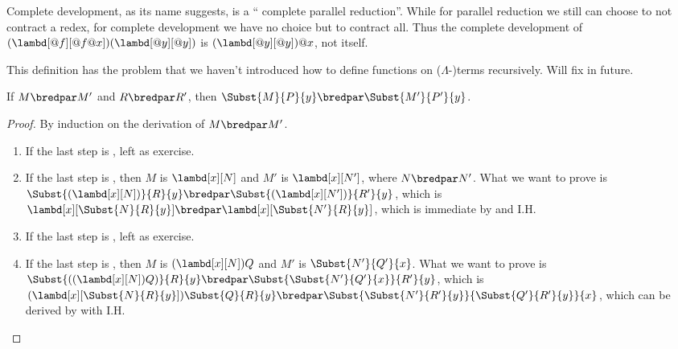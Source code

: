 \documentclass[../../../include/open-logic-section]{subfiles}
\begin{document}
Complete development, as its name suggests, is a ``
complete parallel reduction''. While for parallel reduction we still can choose
to not contract a redex, for complete development we have no choice
but to contract all. Thus the complete
development of $(\lambd[@f][@f@x])(\lambd[@y][@y])$ is
$(\lambd[@y][@y])@x$, not itself.

\begin{editorial}
  This definition has the problem that we haven't introduced how to
  define functions on ($\Lambda$-)terms recursively. Will fix in future.
\end{editorial}

\begin{lem}
  If $M \bredpar M'$ and $R \bredpar R'$, then $\Subst{M}{P}{y}
  \bredpar \Subst{M'}{P'}{y}$.
\end{lem}
\begin{proof}
  By induction on the derivation of $M \bredpar M'$.
  \begin{enumerate}
    \item If the last step is , left as exercise.
    \item If the last step is , then $M$ is 
      $\lambd[x][N]$ and $M'$ is $\lambd[x][N']$,
      where $N \bredpar N'$. What we want to prove is
      $\Subst{(\lambd[x][N])}{R}{y} \bredpar
      \Subst{(\lambd[x][N'])}{R'}{y}$, which is
      $\lambd[x][\Subst{N}{R}{y}] \bredpar
      \lambd[x][\Subst{N'}{R}{y}]$, which is immediate by
       and I.H.
    \item If the last step is , left as exercise.
    \item If the last step is , then $M$ is
      $(\lambd[x][N])Q$ and $M'$ is $\Subst{N'}{Q'}{x}$. What
      we want to prove is $\Subst{((\lambd[x][N])Q)}{R}{y}
      \bredpar \Subst{\Subst{N'}{Q'}{x}}{R'}{y}$, which is
      $(\lambd[x][\Subst{N}{R}{y}])\Subst{Q}{R}{y} \bredpar
      \Subst{\Subst{N'}{R'}{y}}{\Subst{Q'}{R'}{y}}{x}$, which
      can be derived by  with I.H.
  \end{enumerate}
\end{proof}
\end{document}
